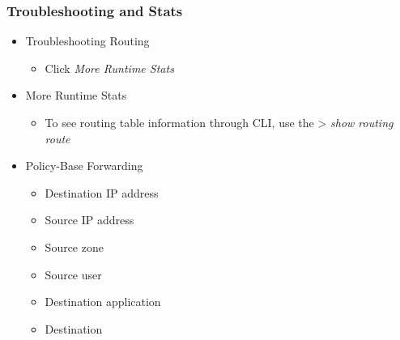 \subsubsection{Troubleshooting and Stats}
    \begin{itemize}
        \item Troubleshooting Routing
            \begin{itemize}
                \item Click \textit{More Runtime Stats}
            \end{itemize}
        \item More Runtime Stats
            \begin{itemize}
                \item To see routing table information through CLI, use the > \textit{show routing route}
            \end{itemize}
        \item Policy-Base Forwarding
            \begin{itemize}
                \item Destination IP address
                \item Source IP address
                \item Source zone
                \item Source user
                \item Destination application
                \item Destination
            \end{itemize}
    \end{itemize}

